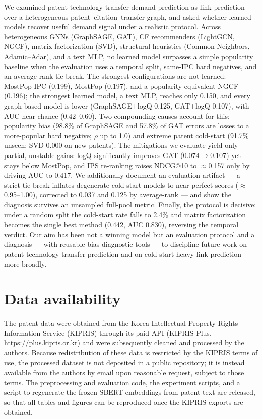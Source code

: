 \documentclass[preprint,12pt]{elsarticle}
\begin{document}
We examined patent technology-transfer demand prediction as link prediction over a
heterogeneous patent--citation--transfer graph, and asked whether learned models
recover useful demand signal under a realistic protocol. Across heterogeneous GNNs
(GraphSAGE, GAT), CF recommenders (LightGCN, NGCF), matrix factorization (SVD),
structural heuristics (Common Neighbors, Adamic--Adar), and a text MLP, no learned
model surpasses a simple popularity baseline when the evaluation uses a temporal split,
same-IPC hard negatives, and an average-rank tie-break. The strongest configurations
are not learned: MostPop-IPC (0.199), MostPop (0.197), and a popularity-equivalent NGCF
(0.196); the strongest learned model, a text MLP, reaches only 0.150, and every
graph-based model is lower (GraphSAGE+logQ 0.125, GAT+logQ 0.107), with AUC near chance
(0.42--0.60). Two compounding causes account for this: popularity bias (98.8\% of
GraphSAGE and 57.8\% of GAT errors are losses to a more-popular hard negative; $\rho$ up
to 1.0) and extreme patent cold-start (91.7\% unseen; SVD 0.000 on new patents). The
mitigations we evaluate yield only partial, unstable gains: logQ significantly improves
GAT ($0.074\!\to\!0.107$) yet stays below MostPop, and IPS re-ranking raises NDCG@10 to
$\approx$0.157 only by driving AUC to 0.417. We additionally document an evaluation
artifact --- a strict tie-break inflates degenerate cold-start models to near-perfect
scores ($\approx$0.95--1.00), corrected to 0.037 and 0.125 by average-rank --- and show
the diagnosis survives an unsampled full-pool metric. Finally, the protocol is
decisive: under a random split the cold-start rate falls to 2.4\% and matrix
factorization becomes the single best method (0.442, AUC 0.830), reversing
the temporal verdict. Our aim has been not a winning model but an evaluation protocol
and a diagnosis --- with reusable bias-diagnostic tools --- to discipline future work on
patent technology-transfer prediction and on cold-start-heavy link prediction more
broadly.

\section*{Data availability}
The patent data were obtained from the Korea Intellectual Property Rights Information
Service (KIPRIS) through its paid API (KIPRIS Plus, \url{https://plus.kipris.or.kr})
and were subsequently cleaned and processed by the authors. Because redistribution of
these data is restricted by the KIPRIS terms of use, the processed dataset is not
deposited in a public repository; it is instead available from the authors by email
upon reasonable request, subject to those terms. The preprocessing and
evaluation code, the experiment scripts, and a script to regenerate the frozen SBERT
embeddings from patent text are released, so that all tables and figures can be
reproduced once the KIPRIS exports are obtained.
\end{document}
